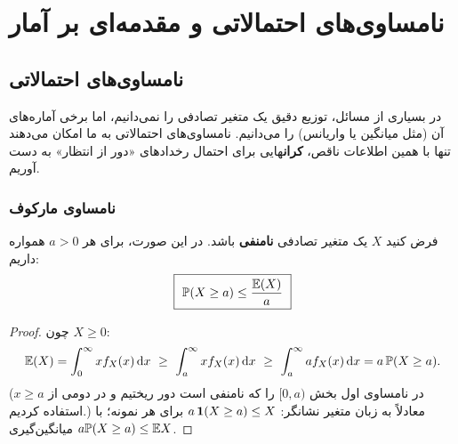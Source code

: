 \chapter{نامساوی‌های احتمالاتی و مقدمه‌ای بر آمار}

\section{نامساوی‌های احتمالاتی }

در بسیاری از مسائل، توزیع دقیق یک متغیر تصادفی را نمی‌دانیم، اما برخی آماره‌های آن (مثل میانگین یا واریانس) را می‌دانیم. نامساوی‌های احتمالاتی به ما امکان می‌دهند تنها با همین اطلاعات ناقص، \textbf{کران}هایی برای احتمال رخدادهای «دور از انتظار» به دست آوریم.

\subsection{نامساوی مارکوف }
\begin{theorem}
فرض کنید $X$ یک متغیر تصادفی \textbf{نامنفی} باشد. در این صورت، برای هر $a>0$ همواره داریم:
\[
\boxed{\ \mathbb{P}(X\ge a)\le\frac{\mathbb{E}(X)}{a}\ }
\]
\end{theorem}
\begin{proof}
چون $X\ge0$:
\[
\E(X)=\int_0^\infty xf_X(x)\dd x\ \ge\ \int_a^\infty xf_X(x)\dd x\ \ge\ \int_a^\infty af_X(x)\dd x=a\,\Prob(X\ge a).
\]
(در نامساوی اول بخش $[0,a)$ را که نامنفی است دور ریختیم و در دومی از $x\ge a$ استفاده کردیم.) معادلاً به زبان متغیر نشانگر: $a\,\mathbf{1}(X\ge a)\le X$ برای هر نمونه؛ با میانگین‌گیری $a\mathbb{P}(X\ge a)\le\mathbb{E} X$.
\end{proof}

\begin{center}
\end{center}


